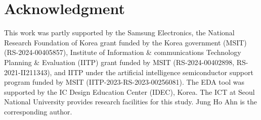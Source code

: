 \documentclass[conference]{IEEEtran}
\begin{document}











\section*{Acknowledgment}
This work was partly supported by the Samsung Electronics, the National Research Foundation of Korea grant funded by the Korea government (MSIT) (RS-2024-00405857), Institute of Information \& communications Technology Planning \& Evaluation (IITP) grant funded by MSIT (RS-2024-00402898, RS-2021-II211343), and IITP under the artificial intelligence semiconductor support program funded by MSIT (IITP-2023-RS-2023-00256081).
The EDA tool was supported by the IC Design Education Center (IDEC), Korea.
The ICT at Seoul National University provides research facilities for this study.
Jung Ho Ahn is the corresponding author.



\balance


\end{document}
